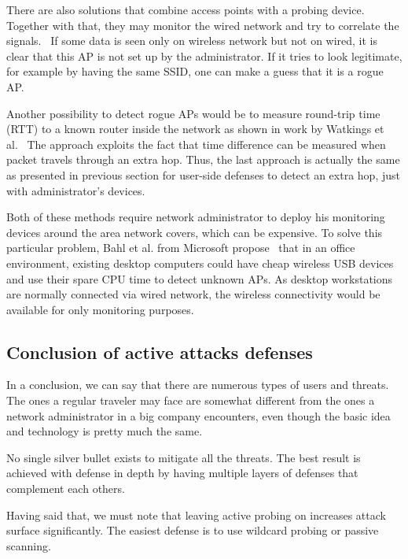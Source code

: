 \documentclass[12pt,a4paper,oneside,pdftex]{report}
\begin{document}
There are also solutions that combine access points with a probing device. Together with that, they may monitor the wired network and try to correlate the signals.~\cite{proxim_rogue_ap} If some data is seen only on wireless network but not on wired, it is clear that this AP is not set up by the administrator. If it tries to look legitimate, for example by having the same SSID, one can make a guess that it is a rogue AP.

Another possibility to detect rogue APs would be to measure round-trip time (RTT) to a known router inside the network as shown in work by Watkings et al.~\cite{watkins2007passive} The approach exploits the fact that time difference can be measured when packet travels through an extra hop. Thus, the last approach is actually the same as presented in previous section for user-side defenses to detect an extra hop, just with administrator's devices.

Both of these methods require network administrator to deploy his monitoring devices around the area network covers, which can be expensive. To solve this particular problem, Bahl et al. from Microsoft propose~\cite{bahl2005dair} that in an office environment, existing desktop computers could have cheap wireless USB devices and use their spare CPU time to detect unknown APs. As desktop workstations are normally connected via wired network, the wireless connectivity would be available for only monitoring purposes.

\subsection{Conclusion of active attacks defenses}

In a conclusion, we can say that there are numerous types of users and threats. The ones a regular traveler may face are somewhat different from the ones a network administrator in a big company encounters, even though the basic idea and technology is pretty much the same.

No single silver bullet exists to mitigate all the threats. The best result is achieved with defense in depth by having multiple layers of defenses that complement each others.

Having said that, we must note that leaving active probing on increases attack surface significantly. The easiest defense is to use wildcard probing or passive scanning.


\end{document}
